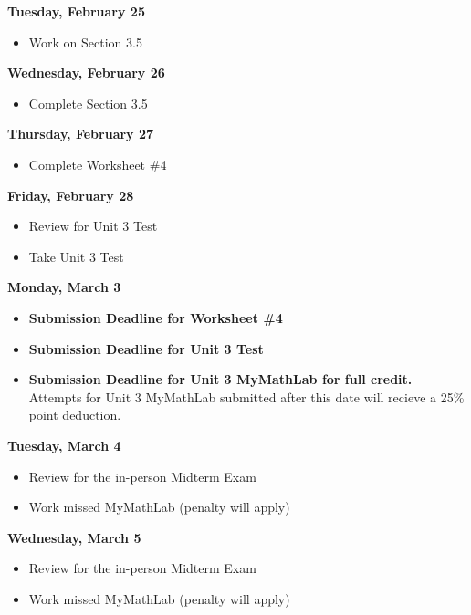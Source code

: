 \documentclass[11pt]{article}
\begin{document}
\textbf{Tuesday, February 25}

\begin{itemize}
\item Work on Section 3.5
\end{itemize}

\textbf{Wednesday, February 26}

\begin{itemize}
\item Complete Section 3.5
\end{itemize}

\textbf{Thursday, February 27}

\begin{itemize}
\item Complete Worksheet \#4
\end{itemize}

\textbf{Friday, February 28}

\begin{itemize}
\item Review for Unit 3 Test
\item Take Unit 3 Test
\end{itemize}

\textbf{Monday, March 3}

\begin{itemize}
\item \textbf{Submission Deadline for Worksheet \#4}
\item \textbf{Submission Deadline for Unit 3 Test}
\item \textbf{Submission Deadline for Unit 3 MyMathLab for full credit.} Attempts for Unit 3 MyMathLab submitted after this date will recieve a 25\% point deduction.
\end{itemize}

\textbf{Tuesday, March 4}

\begin{itemize}
\item Review for the in-person Midterm Exam
\item Work missed MyMathLab (penalty will apply)
\end{itemize}

\textbf{Wednesday, March 5}

\begin{itemize}
\item Review for the in-person Midterm Exam
\item Work missed MyMathLab (penalty will apply)
\end{itemize}
\end{document}
